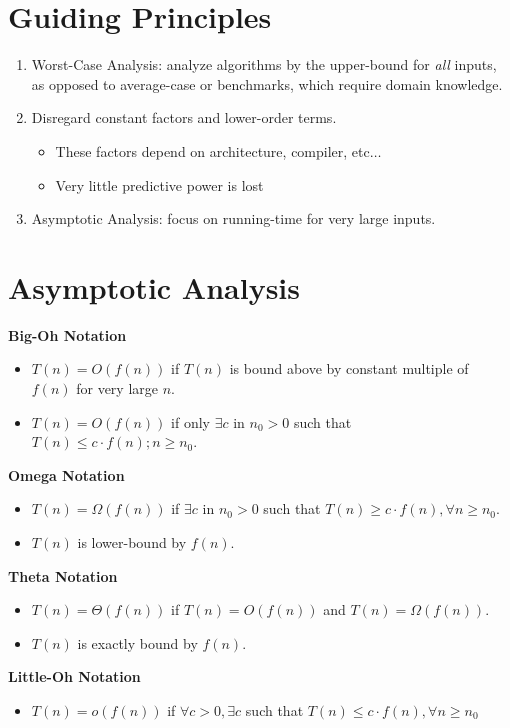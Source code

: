 \documentclass[11pt]{article}
\begin{document}
\section{Guiding Principles}
	\begin{enumerate}
		\item Worst-Case Analysis: analyze algorithms by the upper-bound for \emph{all} inputs, as opposed to average-case or benchmarks, which require domain knowledge.
		\item Disregard constant factors and lower-order terms.
		\begin{itemize}
			\item These factors depend on architecture, compiler, etc$\ldots$
			\item Very little predictive power is lost
		\end{itemize}
		\item Asymptotic Analysis: focus on running-time for very large inputs.
	\end{enumerate}
	
\section{Asymptotic Analysis}
	\textbf{Big-Oh Notation}
	\begin{itemize}
		\item $T(n) = O(f(n))$ if $T(n)$ is bound above by constant multiple of $f(n)$ for very large $n$.
		\item $T(n) = O(f(n))$ if only $\exists c$ in $n_0 > 0$ such that $T(n) \leq c\cdot f(n); n\geq n_0$.
	\end{itemize}
	\textbf{Omega Notation}
	\begin{itemize}
		\item $T(n) = \Omega (f(n))$ if $\exists c$ in $n_0 > 0$ such that $T(n) \geq c\cdot f(n), \forall n\geq n_0$.
		\item $T(n)$ is lower-bound by $f(n)$.
	\end{itemize}
	\textbf{Theta Notation}
	\begin{itemize}
		\item $T(n) = \Theta (f(n))$ if $T(n) = O(f(n))$ and $T(n)=\Omega (f(n))$.
		\item $T(n)$ is exactly bound by $f(n)$.
	\end{itemize}
	\textbf{Little-Oh Notation}
	\begin{itemize}
		\item $T(n) = o(f(n))$ if $\forall c > 0, \exists c$ such that $T(n) \leq c\cdot f(n), \forall n\geq n_0$
	\end{itemize}
\end{document}
